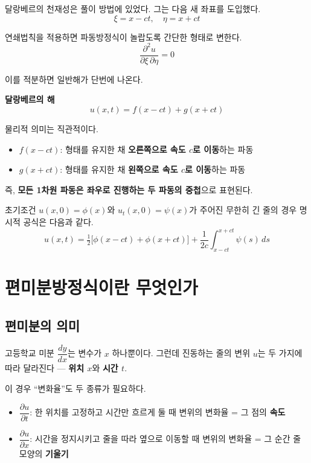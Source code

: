 \documentclass[11pt,a4paper]{article}
\begin{document}
달랑베르의 천재성은 풀이 방법에 있었다. 그는 다음 새 좌표를 도입했다.
\[
\xi = x - ct, \quad \eta = x + ct
\]

연쇄법칙을 적용하면 파동방정식이 놀랍도록 간단한 형태로 변한다.
\[
\frac{\partial^2 u}{\partial \xi\, \partial \eta} = 0
\]

이를 적분하면 일반해가 단번에 나온다.

\begin{quotebox}
\centering
\textbf{달랑베르의 해}
\[
u(x, t) = f(x - ct) + g(x + ct)
\]
\end{quotebox}

물리적 의미는 직관적이다.
\begin{itemize}[leftmargin=*, itemsep=1pt]
  \item $f(x - ct)$: 형태를 유지한 채 \textbf{오른쪽으로 속도 $c$로 이동}하는 파동
  \item $g(x + ct)$: 형태를 유지한 채 \textbf{왼쪽으로 속도 $c$로 이동}하는 파동
\end{itemize}

즉, \textbf{모든 1차원 파동은 좌우로 진행하는 두 파동의 중첩}으로 표현된다.

초기조건 $u(x,0) = \phi(x)$와 $u_t(x,0) = \psi(x)$가 주어진 무한히 긴 줄의 경우 명시적 공식은 다음과 같다.
\begin{equation}
u(x, t) = \tfrac{1}{2}\bigl[\phi(x - ct) + \phi(x + ct)\bigr] + \frac{1}{2c}\int_{x - ct}^{x + ct} \psi(s)\, ds
\end{equation}

\section{편미분방정식이란 무엇인가}

\subsection{편미분의 의미}

고등학교 미분 $\dfrac{dy}{dx}$는 변수가 $x$ 하나뿐이다. 그런데 진동하는 줄의 변위 $u$는 두 가지에 따라 달라진다 --- \textbf{위치 $x$}와 \textbf{시간 $t$}.

이 경우 ``변화율''도 두 종류가 필요하다.

\begin{itemize}[leftmargin=*, itemsep=2pt]
  \item $\dfrac{\partial u}{\partial t}$: 한 위치를 고정하고 시간만 흐르게 둘 때 변위의 변화율 = 그 점의 \textbf{속도}
  \item $\dfrac{\partial u}{\partial x}$: 시간을 정지시키고 줄을 따라 옆으로 이동할 때 변위의 변화율 = 그 순간 줄 모양의 \textbf{기울기}
\end{itemize}
\end{document}
